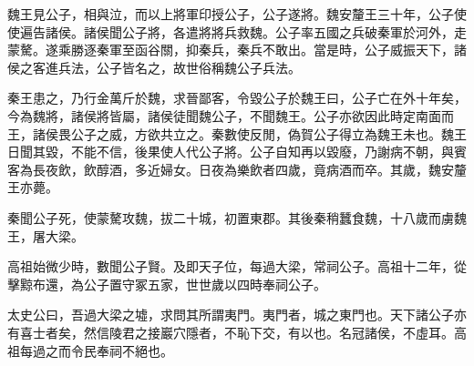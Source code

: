 魏王見公子，相與泣，而以上將軍印授公子，公子遂將。魏安釐王三十年，公子使使遍告諸侯。諸侯聞公子將，各遣將將兵救魏。公子率五國之兵破秦軍於河外，走蒙驁。遂乘勝逐秦軍至函谷關，抑秦兵，秦兵不敢出。當是時，公子威振天下，諸侯之客進兵法，公子皆名之，故世俗稱魏公子兵法。

秦王患之，乃行金萬斤於魏，求晉鄙客，令毀公子於魏王曰，公子亡在外十年矣，今為魏將，諸侯將皆屬，諸侯徒聞魏公子，不聞魏王。公子亦欲因此時定南面而王，諸侯畏公子之威，方欲共立之。秦數使反閒，偽賀公子得立為魏王未也。魏王日聞其毀，不能不信，後果使人代公子將。公子自知再以毀廢，乃謝病不朝，與賓客為長夜飲，飲醇酒，多近婦女。日夜為樂飲者四歲，竟病酒而卒。其歲，魏安釐王亦薨。

秦聞公子死，使蒙驁攻魏，拔二十城，初置東郡。其後秦稍蠶食魏，十八歲而虜魏王，屠大梁。

高祖始微少時，數聞公子賢。及即天子位，每過大梁，常祠公子。高祖十二年，從擊黥布還，為公子置守冢五家，世世歲以四時奉祠公子。

太史公曰，吾過大梁之墟，求問其所謂夷門。夷門者，城之東門也。天下諸公子亦有喜士者矣，然信陵君之接巖穴隱者，不恥下交，有以也。名冠諸侯，不虛耳。高祖每過之而令民奉祠不絕也。